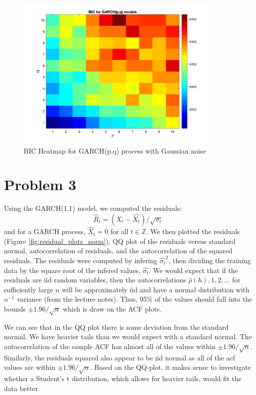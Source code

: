 \documentclass{article}
\begin{document}
\begin{figure}[H]
\includegraphics[width=10cm]{plots/bic_heatmap_norm.png}
\centering
\caption{BIC Heatmap for GARCH(p,q) process with Gaussian noise}
\label{fig:bic_heatmap_norm}
\end{figure}

\section*{Problem 3}

Using the GARCH(1,1) model, we computed the residuals:
$$
\hat{R}_t = (X_t - \hat{X_t})/\sqrt{\sigma_t}
$$
and for a GARCH process, $\hat{X}_t = 0$ for all $t \in \mathbb Z$.
We then plotted the residuals (Figure \ref{fig:residual_plots_norm}), QQ plot of the residuals versus standard normal, autocorrelation of residuals, and the autocorrelation of the squared residuals.
The residuals were computed by infering $\hat{\sigma_t}^2$, then dividing the training data by the square root of the infered values, $\hat{\sigma_t}$.
We would expect that if the residuals are iid random variables, then the autocorrelations $\hat{\rho}(h), 1,2,\ldots$ for sufficiently large $n$ will be approximately iid and have a normal distribution with $n^{-1}$ variance (from the lecture notes).
Thus, 95\% of the values should fall into the bounds $\pm 1.96 / \sqrt{n}$ which is draw on the ACF plots.

We can see that in the QQ plot there is some deviation from the standard normal.
We have heavier tails than we would expect with a standard normal.
The autocorrelation of the sample ACF has almost all of the values within $\pm 1.96 / \sqrt{n}$.
Similarly, the residuals squared also appear to be iid normal as all of the acf values are within $\pm 1.96 / \sqrt{n}$.
Based on the QQ-plot, it makes sense to investigate whether a Student's t distribution, which allows for heavier tails, would fit the data better.
\end{document}
